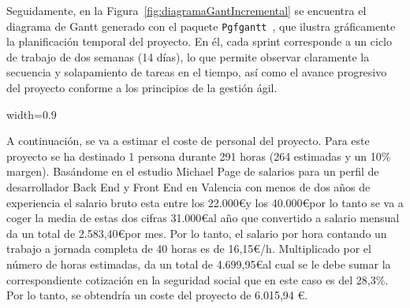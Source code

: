 Seguidamente, en la Figura~\ref{fig:diagramaGantIncremental} se encuentra el diagrama de \gls{Gantt} generado con el paquete \texttt{Pgfgantt}~\cite{pgfgant:website}, que ilustra gráficamente la planificación temporal del proyecto. En él, cada sprint corresponde a un ciclo de trabajo de dos semanas (14 días), lo que permite observar claramente la secuencia y solapamiento de tareas en el tiempo, así como el avance progresivo del proyecto conforme a los principios de la gestión ágil.

\begin{sidewaysfigure}
    \begin{minipage}{1\linewidth}
        \centering
        \begin{adjustbox}{width=0.9\textwidth} 
             
        \end{adjustbox}
        \caption{Diagrama de Gantt del proyecto}
        \label{fig:diagramaGantIncremental}
    \end{minipage}
\end{sidewaysfigure}


A continuación, se va a estimar el coste de personal del proyecto. Para este proyecto se ha destinado 1 persona durante 291 horas (264 estimadas y un 10\% margen). Basándome en el estudio Michael Page de salarios \cite{salarios:2024} para un perfil de desarrollador Back End y Front End en Valencia con menos de dos años de experiencia el salario bruto esta entre los 22.000\euro\space y los 40.000\euro\space por lo tanto se va a coger la media de estas dos cifras 31.000\euro\space al año que convertido a salario mensual da un total de 2.583,40\euro\space por mes. Por lo tanto, el salario por hora contando un trabajo a jornada completa de 40 horas es de 16,15\euro/h\space. Multiplicado por el número de horas estimadas, da un total de 4.699,95\euro\space al cual se le debe sumar la correspondiente cotización en la seguridad social \cite{cotizacion:web} que en este caso es del 28,3\%. Por lo tanto, se obtendría un coste del proyecto de 6.015,94 \euro.

